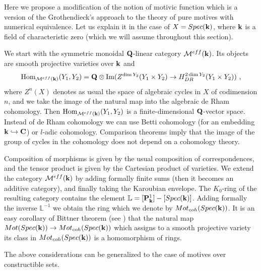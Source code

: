 \documentclass[12pt]{article}
\begin{document}
Here we propose a modification of the notion of motivic function which is a version of the Grothendieck's approach to the theory of pure motives with numerical equivalence. Let us explain it in the case of $X=Spec({\bf k})$, where ${\bf k}$ is a field of characteristic zero (which we will assume throughout this section).

We start with the symmetric monoidal ${\bf Q}$-linear category ${\cal M}^{eff}({\bf k})$. Its objects are smooth projective varieties over ${\bf k}$ and
$$\operatorname{Hom}_{{\cal M}^{eff}({\bf k})}(Y_1,Y_2)={\bf Q}\otimes \operatorname{Im}(Z^{\dim Y_2}(Y_1\times Y_2)\to H_{DR}^{2\dim Y_2}(Y_1\times Y_2))\,\,,$$
where $Z^n(X)$ denotes as usual the space of algebraic cycles in $X$ of codimension $n$, and we take the image of the natural map into the algebraic de Rham cohomology. Then $\operatorname{Hom}_{{\cal M}^{eff}({\bf k})}(Y_1,Y_2)$ is a finite-dimensional ${\bf Q}$-vector space.
Instead of de Rham cohomology we can use Betti cohomology (for an embedding ${\bf k}\hookrightarrow {\bf C}$) or $l$-adic cohomology. Comparison theorems imply that the image of the group of cycles in the cohomology does not depend on a cohomology theory.

Composition of morphisms is given by the usual composition of correspondences, and the tensor product is given by the Cartesian product of varieties. We extend the category ${\cal M}^{eff}({\bf k})$ by adding formally finite sums (then it becomes an additive category), and finally taking the Karoubian envelope. The $K_0$-ring of the resulting category
contains the element ${\mathbb L}=[{\bf P}_{{\bf k}}^1]-[Spec({\bf k})]$. Adding formally the inverse ${\mathbb L}^{-1}$ we obtain the ring which we denote by $Mot_{coh}(Spec({\bf k}))$. It is an easy corollary of Bittner theorem (see \cite{Bit}) that the natural map $Mot(Spec({\bf k}))\to Mot_{coh}(Spec({\bf k}))$ which assigns to a smooth projective variety its class in
$Mot_{coh}(Spec({\bf k}))$ is a homomorphism of rings.


The above considerations can be generalized to the case of motives over constructible sets.
\end{document}
